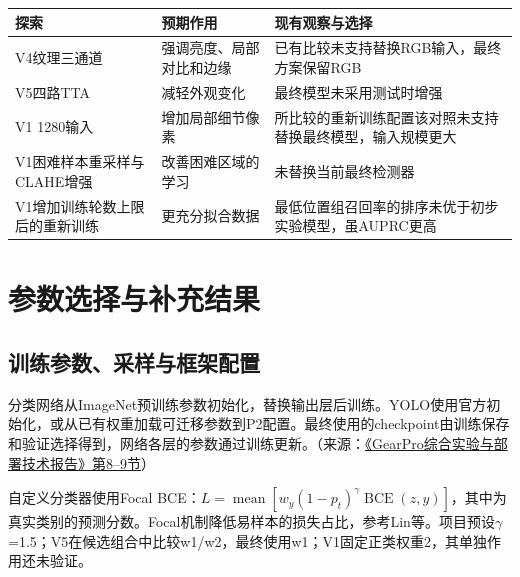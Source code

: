 \par\medskip\noindent\begin{minipage}{\linewidth}\small{}
\begin{tabular}{@{}>{\raggedright\arraybackslash}p{0.240\dimexpr\linewidth-4\tabcolsep\relax}>{\raggedright\arraybackslash}p{0.340\dimexpr\linewidth-4\tabcolsep\relax}>{\raggedright\arraybackslash}p{0.420\dimexpr\linewidth-4\tabcolsep\relax}@{}}
\toprule
探索 & 预期作用 & 现有观察与选择 \\
\midrule
V4纹理三通道 & 强调亮度、局部对比和边缘 & 已有比较未支持替换RGB输入，最终方案保留RGB \\
V5四路TTA & 减轻外观变化 & 最终模型未采用测试时增强 \\
V1 1280输入 & 增加局部细节像素 & 所比较的重新训练配置该对照未支持替换最终模型，输入规模更大 \\
V1困难样本重采样与CLAHE增强 & 改善困难区域的学习 & 未替换当前最终检测器 \\
V1增加训练轮数上限后的重新训练 & 更充分拟合数据 & 最低位置组召回率的排序未优于初步实验模型，虽AUPRC更高 \\
\bottomrule\end{tabular}\end{minipage}\par\medskip


\FloatBarrier{}\section{参数选择与补充结果}
\FloatBarrier{}\subsection{训练参数、采样与框架配置}
分类网络从ImageNet预训练参数初始化，替换输出层后训练。YOLO使用官方初始化，或从已有权重加载可迁移参数到P2配置。最终使用的checkpoint由训练保存和验证选择得到，网络各层的参数通过训练更新。（来源：\protect\href{run:../../GearPro_综合技术报告_Markdown含配图/GearPro_综合实验与部署技术报告.md}{《GearPro综合实验与部署技术报告》第8--9节}）

自定义分类器使用Focal BCE：$L=\operatorname{mean}[w_y(1-p_t)^\gamma\operatorname{BCE}(z,y)]$，其中为真实类别的预测分数。Focal机制降低易样本的损失占比，参考Lin等\cite{ref13}。项目预设\ensuremath{\gamma}=1.5；V5在候选组合中比较w1/w2，最终使用w1；V1固定正类权重2，其单独作用还未验证。

